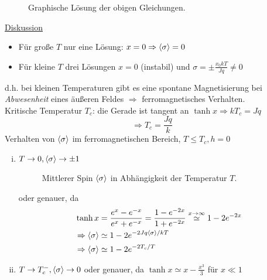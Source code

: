 \begin{enumerate}[A)]
\begin{figure}[H]
        \def\svgwidth{0.7\textwidth}
        
        \caption{Graphische Lösung der obigen Gleichungen.}
        \label{img:SolMFA}
    \end{figure}
    \underline{Diskussion}
    \begin{itemize}
        \item Für große $T$ nur eine Lösung: $x = 0 \Rightarrow \left\langle\sigma\right\rangle = 0$
        \item Für kleine $T$ drei Lösungen $x = 0$ (instabil) und $\sigma = \pm \frac{x_0 k T}{J q} \neq 0$
    \end{itemize}
    d.h. bei kleinen Temperaturen gibt es eine spontane Magnetisierung bei \emph{Abwesenheit} eines äußeren Feldes
    $\Rightarrow$ ferromagnetisches Verhalten. \\
    Kritische Temperatur $T_c$: die Gerade ist tangent an $\tanh x \Rightarrow k T_c = J q$
    \begin{equation}
        \Rightarrow T_c = \frac{J q}{k}
    \end{equation}
    Verhalten von $\left\langle\sigma\right\rangle$ im ferromagnetischen Bereich, $T \leq T_c, h = 0$
    \begin{enumerate}[i)]
        \item $T \to 0, \left\langle\sigma\right\rangle \to \pm 1$
        \begin{figure}[H]
            \centering
            \def\svgwidth{0.4\textwidth}
            
            \caption{Mittlerer Spin $\left\langle\sigma\right\rangle$ in Abhängigkeit der Temperatur $T$.}
            \label{img:sigma_T_Diag}
        \end{figure}
        oder genauer, da
        \begin{equation}
            \begin{split}
                \tanh x &= \frac{e^x - e^{-x}}{e^x + e^{-x}} = \frac{1 - e^{-2x}}{1 + e^{-2x}} \overset{x \to \infty}{\simeq} 1 - 2 e^{-2x} \\
                \Rightarrow \left\langle\sigma\right\rangle &\simeq 1 - 2 e^{- 2 J q \left\langle\sigma\right\rangle / k T} \\
                \Rightarrow \left\langle\sigma\right\rangle &\simeq 1 - 2 e^{-2 T_c / T}
            \end{split}
        \end{equation}
        \item $T \to T_c^-, \left\langle\sigma\right\rangle \to 0$
        oder genauer, da $\tanh x \simeq x - \frac{x^3}{3}$ für $x \ll 1$
        \begin{equation}
            \begin{split}

\end{split}
\end{equation}
\end{enumerate}
\end{enumerate}

